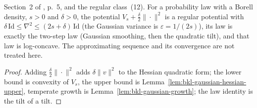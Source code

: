 \begin{lemma}
  \label{lem:bkl-regular-producer}
  \leanok
  Section~2 of \cite{BizeulKlartagLehec2026}, p.~5, and the regular class~(12). For a probability
  law with a Borell density, $s>0$ and $\delta>0$, the potential $V_s+\tfrac\delta2\|\cdot\|^2$ is a
  regular potential with $\delta\,\mathrm{Id}\le\nabla^2\le(2s+\delta)\,\mathrm{Id}$ (the Gaussian
  variance is $\varepsilon=1/(2s)$), its law is exactly the two-step law (Gaussian smoothing, then
  the quadratic tilt), and that law is log-concave. The approximating sequence and its convergence
  are not treated here.
\end{lemma}
\begin{proof}
  \leanok
  Adding $\tfrac\delta2\|\cdot\|^2$ adds $\delta\|v\|^2$ to the Hessian quadratic form; the lower
  bound is convexity of $V_s$, the upper bound is Lemma~\ref{lem:bkl-gaussian-hessian-upper},
  temperate growth is Lemma~\ref{lem:bkl-gaussian-growth}; the law identity is the tilt of a tilt.
\end{proof}


